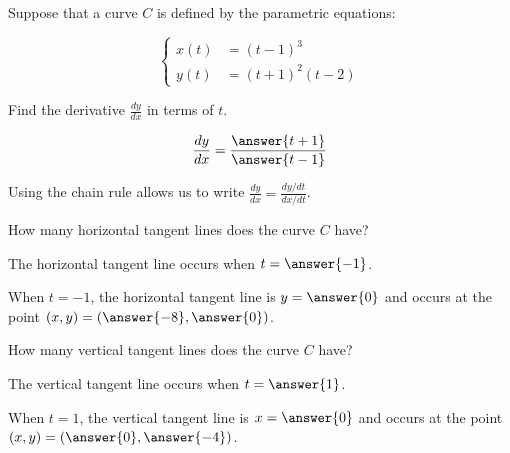 \documentclass{ximera}
\author{Alex Beckwith}
\begin{document}
\begin{exercise}

Suppose that a curve $C$ is defined by the parametric equations:

\[
\begin{cases}
x(t) &= (t-1)^3 \\
y(t) &= (t+1)^2(t-2)
\end{cases}
\]

Find the derivative $\frac{dy}{dx}$ in terms of $t$.

\[
\frac{dy}{dx} = \frac{\answer{t+1}}{\answer{t-1}}
\]

\begin{hint}
Using the chain rule allows us to write $\frac{dy}{dx} = \frac{dy/dt}{dx/dt}$.
\end{hint}

\begin{exercise}
How many horizontal tangent lines does the curve $C$ have?
\begin{multipleChoice}
\end{multipleChoice}

The horizontal tangent line occurs when $t=\answer{-1}$.

\begin{exercise}
When $t=-1$, the horizontal tangent line is $y=\answer{0}$ and occurs at the point $(x,y) = \left(\answer{-8},\answer{0}\right)$.
\end{exercise}

\begin{exercise}
How many vertical tangent lines does the curve $C$ have?
\begin{multipleChoice}
\end{multipleChoice}

The vertical tangent line occurs when $t=\answer{1}$.

When $t=1$, the vertical tangent line is $x=\answer{0}$ and occurs at the point $(x,y) = \left(\answer{0},\answer{-4}\right)$.
\end{exercise}
\end{exercise}
\end{exercise}
\end{document}
